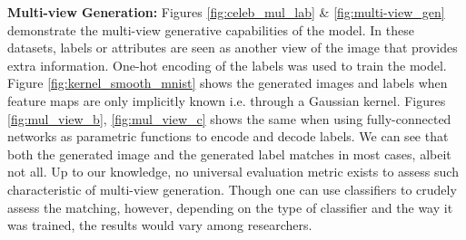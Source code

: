 \documentclass[preview,border=0.3pt]{standalone}
\begin{document}
\noindent \textbf{Multi-view Generation:}
%
Figures \ref{fig:celeb_mul_lab} \& \ref{fig:multi-view_gen} demonstrate the multi-view generative capabilities of the model. In these datasets, labels or attributes are seen as another view of the image that provides extra information. One-hot encoding of the labels was used to train the model. Figure \ref{fig:kernel_smooth_mnist} shows the generated images and labels when feature maps are only implicitly known i.e. through a Gaussian kernel. Figures \ref{fig:mul_view_b}, \ref{fig:mul_view_c} shows the same when using fully-connected networks as parametric functions to encode and decode labels. We can see that both the generated image and the generated label matches in most cases, albeit not all. Up to our knowledge, no universal evaluation metric exists to assess such characteristic of multi-view generation. Though one can use classifiers to crudely assess the matching, however, depending on the type of classifier and the way it was trained, the results would vary among researchers.
\end{document}
